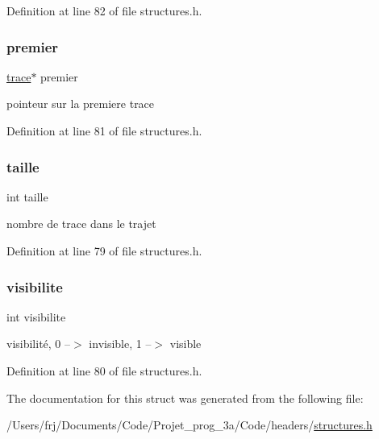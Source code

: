 Definition at line 82 of file structures.\+h.

\hypertarget{structtrajet_acc04ed138412836472c25ba9913c7474}{}\label{structtrajet_acc04ed138412836472c25ba9913c7474} 
\subsubsection{\texorpdfstring{premier}{premier}}
{\footnotesize\ttfamily \hyperlink{structtrace}{trace}$\ast$ premier}

pointeur sur la premiere trace 

Definition at line 81 of file structures.\+h.

\hypertarget{structtrajet_a29bf3fc0ffe4e72e45f0c84ab4f8cd1e}{}\label{structtrajet_a29bf3fc0ffe4e72e45f0c84ab4f8cd1e} 
\subsubsection{\texorpdfstring{taille}{taille}}
{\footnotesize\ttfamily int taille}

nombre de trace dans le trajet 

Definition at line 79 of file structures.\+h.

\hypertarget{structtrajet_aa34b47a3ed3a7dfed8a672132bcc3f2a}{}\label{structtrajet_aa34b47a3ed3a7dfed8a672132bcc3f2a} 
\subsubsection{\texorpdfstring{visibilite}{visibilite}}
{\footnotesize\ttfamily int visibilite}

visibilité, 0 --$>$ invisible, 1 --$>$ visible 

Definition at line 80 of file structures.\+h.



The documentation for this struct was generated from the following file\+:\begin{DoxyCompactItemize}
\item 
/\+Users/frj/\+Documents/\+Code/\+Projet\+\_\+prog\+\_\+3a/\+Code/headers/\hyperlink{structures_8h}{structures.\+h}\end{DoxyCompactItemize}
